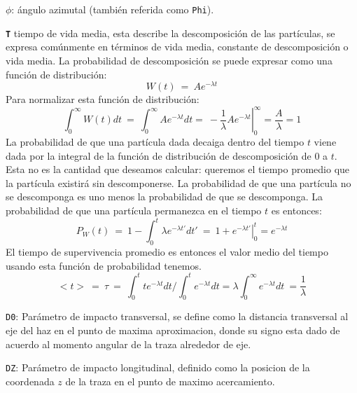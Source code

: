 \begin{itemize_f}
\item $\mathtt{\phi}$: ángulo azimutal (también referida como \texttt{Phi}).\\
\item \textbf{\texttt{T}} tiempo de vida media, esta describe la descomposición de las partículas, se expresa comúnmente en términos de vida media, constante de descomposición o vida media. La probabilidad de descomposición se puede expresar como una función de distribución:
\begin{equation}
W (t)~ = ~ A e^{-\lambda t} 
\end{equation}
Para normalizar esta función de distribución:
\begin{equation}
\int_0^\infty W (t) dt ~ = ~ \int_0^\infty A e^{-\lambda t} dt = ~ - \left. \dfrac{1}{\lambda} A e^{-\lambda t} \right|_0^\infty = \dfrac{A}{\lambda} = 1
\end{equation}
La probabilidad de que una partícula dada decaiga dentro del tiempo $t$ viene dada por la integral de la función de distribución de descomposición de $0$ a $t$. Esta no es la cantidad que deseamos calcular: queremos el tiempo promedio que la partícula existirá sin descomponerse. La probabilidad de que una partícula no se descomponga es uno menos la probabilidad de que se descomponga. La probabilidad de que una partícula permanezca en el tiempo $t$ es entonces:
\begin{equation}
P_W(t) ~ = ~ 1 - \int_0^t \lambda e^{-\lambda t'} dt' ~ = ~ 1 +  \left. e^{-\lambda t'} \right|_0^t = e^{-\lambda t}
\end{equation}
El tiempo de supervivencia promedio es entonces el valor medio del tiempo usando esta función de probabilidad tenemos.
\begin{equation}
<t>~ = ~ \tau ~ = ~ \int_0^t te^{-\lambda t} dt/\int_0^t e^{-\lambda t} dt = \lambda \int_0^\infty e^{-\lambda t} dt ~ = \dfrac{1}{\lambda}
\end{equation}

\item[-] \texttt{D0}: Parámetro de impacto transversal, se define como la distancia transversal al eje del haz en el punto de maxima aproximacion, donde su signo esta dado de acuerdo al momento angular de la traza alrededor de eje.\\

\item[-] \texttt{DZ}: Parámetro de impacto longitudinal, definido como la posicion de la coordenada $z$ de la traza en el punto de maximo acercamiento.\\
\end{itemize_f}

